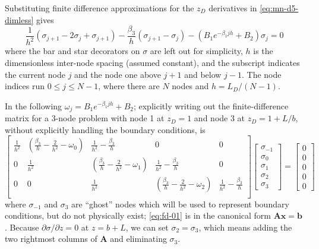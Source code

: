 \documentclass[12pt,letterpaper]{article}
\begin{document}
Substituting finite difference approximations for the $z_D$
derivatives in \eqref{eq:mn-d5-dimless} gives
\begin{equation}
  \nonumber
  \frac{1}{h^2} \left( \sigma_{j+1} - 2 \sigma_j + \sigma_{j+1}
  \right) - \frac{\beta_3}{h} \left( \sigma_{j+1} - \sigma_j\right) -
  \left( B_1 e^{-\beta_1 jh} + B_2 \right) \sigma_j
  = 0
\end{equation}
where the bar and star decorators on $\sigma$ are left out for simplicity, $h$ is
the dimensionless inter-node spacing (assumed constant), and
the subscript indicates the current node $j$ and the node one above
$j+1$ and below $j-1$.  The node indices run $0 \le j \le N-1$, where
 there are $N$ nodes and $h = L_D / (N - 1)$.

In the following $\omega_j = B_1 e^{-\beta_1 jh} + B_2$;
explicitly writing out the finite-difference matrix for a 3-node
problem with node 1 at $z_D=1$ and node 3 at $z_D=1+L/b$, without
explicitly handling the boundary conditions, is
\begin{equation}
  \label{eq:fd-01}
  \left[ \begin{matrix}
    \frac{1}{h^2} & \left(\frac{\beta_3}{h} - \frac{2}{h^2} - \omega_0\right) &
    \frac{1}{h^2} - \frac{\beta_3}{h} & 0 & 0 \\ 
    0 & \frac{1}{h^2} & \left(\frac{\beta_3}{h} - \frac{2}{h^2} - \omega_1 \right)&
    \frac{1}{h^2} - \frac{\beta_3}{h} & 0  \\ 
    0 & 0 & \frac{1}{h^2} & \left(\frac{\beta_3}{h} - \frac{2}{h^2}  -
      \omega_2 \right) &
    \frac{1}{h^2} - \frac{\beta_3}{h} \\ 
  \end{matrix}\right] 
\left[\begin{matrix}
\sigma_{-1} \\ \sigma_0 \\ \sigma_1 \\ \sigma_2 \\ \sigma_3
\end{matrix}\right]
=
\left[\begin{matrix}
0 \\ 0\\ 0 \\ 0 \\ 0
\end{matrix}\right]
\end{equation}
where $\sigma_{-1}$ and $\sigma_3$ are ``ghost'' nodes
which will be used to represent boundary conditions, but do not
physically exist; \eqref{eq:fd-01} is in the canonical form $\mathbf{Ax}=\mathbf{b}$.  Because
$\partial \sigma/\partial z =0$ at $z = b+L$, we can set $\sigma_2=
\sigma_3$, which means adding the two rightmost columns of
$\mathbf{A}$ and eliminating $\sigma_3$.
\end{document}
